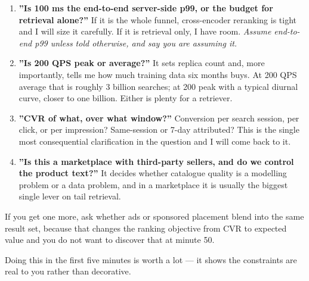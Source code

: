 \documentclass[10pt,twoside]{book}
\newcommand{\csection}[1]{\par\vspace{13pt}\noindent{\sffamily\large\bfseries\color{ink}\raggedright #1\par}\vspace{4pt}}
\begin{document}
\begin{enumerate}
\item \textbf{''Is 100 ms the end-to-end server-side p99, or the budget for retrieval alone?''} If it is the whole funnel, cross-encoder reranking is tight and I will size it carefully. If it is retrieval only, I have room. \textit{Assume end-to-end p99 unless told otherwise, and say you are assuming it.}
\item \textbf{''Is 200 QPS peak or average?''} It sets replica count and, more importantly, tells me how much training data six months buys. At 200 QPS average that is roughly 3 billion searches; at 200 peak with a typical diurnal curve, closer to one billion. Either is plenty for a retriever.
\item \textbf{''CVR of what, over what window?''} Conversion per search session, per click, or per impression? Same-session or 7-day attributed? This is the single most consequential clarification in the question and I will come back to it.
\item \textbf{''Is this a marketplace with third-party sellers, and do we control the product text?''} It decides whether catalogue quality is a modelling problem or a data problem, and in a marketplace it is usually the biggest single lever on tail retrieval.
\end{enumerate}
If you get one more, ask whether ads or sponsored placement blend into the same result set, because that changes the ranking objective from CVR to expected value and you do not want to discover that at minute 50.\par
\csection{Numbers you derive from the prompt, out loud}
Doing this in the first five minutes is worth a lot --- it shows the constraints are real to you rather than decorative.\par
\par{}\par\medskip
\end{document}
